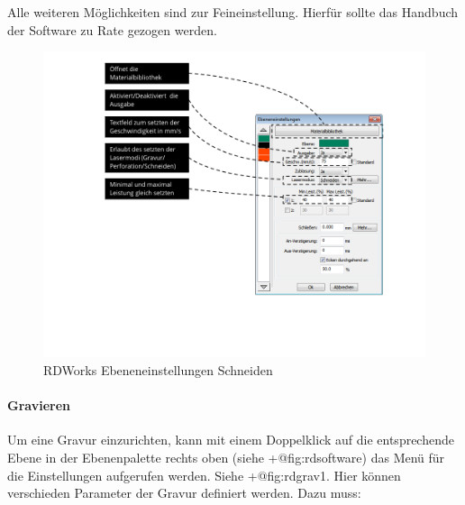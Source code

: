 \documentclass[]{article}
\let\oldparagraph\paragraph
\renewcommand{\paragraph}[1]{\oldparagraph{#1}\mbox{}}
\begin{document}
Alle weiteren Möglichkeiten sind zur Feineinstellung. Hierfür sollte das
Handbuch der Software zu Rate gezogen werden.

\begin{figure}
\hypertarget{fig:rdcut}{%
\centering
\includegraphics{assets/images/rdworks-schneiden.PNG}
\caption{RDWorks Ebeneneinstellungen Schneiden}\label{fig:rdcut}
}
\end{figure}

\hypertarget{gravieren}{%
\paragraph{Gravieren}\label{gravieren}}

Um eine Gravur einzurichten, kann mit einem Doppelklick auf die
entsprechende Ebene in der Ebenenpalette rechts oben (siehe
+@fig:rdsoftware) das Menü für die Einstellungen aufgerufen werden.
Siehe +@fig:rdgrav1. Hier können verschieden Parameter der Gravur
definiert werden. Dazu muss:
\end{document}
